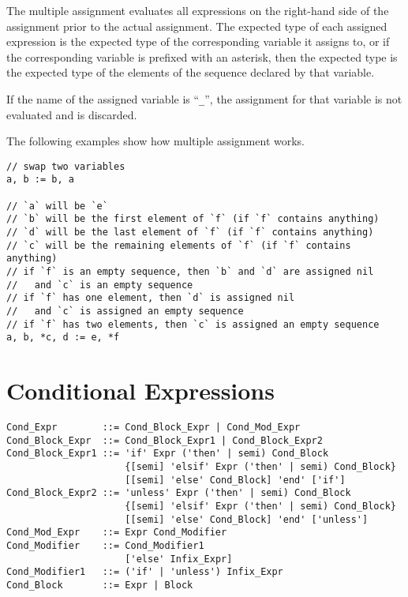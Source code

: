 The multiple assignment evaluates all expressions on the right-hand side of the assignment prior to the actual assignment. The expected type of each assigned expression is the expected type of the corresponding variable it assigns to, or if the corresponding variable is prefixed with an asterisk, then the expected type is the expected type of the elements of the sequence declared by that variable. 

If the name of the assigned variable is ``\lstinline!_!'', the assignment for that variable is not evaluated and is discarded. 

\example The following examples show how multiple assignment works. 
\begin{lstlisting}
// swap two variables
a, b := b, a

// `a` will be `e`
// `b` will be the first element of `f` (if `f` contains anything)
// `d` will be the last element of `f` (if `f` contains anything)
// `c` will be the remaining elements of `f` (if `f` contains anything)
// if `f` is an empty sequence, then `b` and `d` are assigned nil
//   and `c` is an empty sequence
// if `f` has one element, then `d` is assigned nil 
//   and `c` is assigned an empty sequence
// if `f` has two elements, then `c` is assigned an empty sequence
a, b, *c, d := e, *f
\end{lstlisting}





\section{Conditional Expressions}
\label{sec:conditional-expressions}

\syntax\begin{lstlisting}
Cond_Expr        ::= Cond_Block_Expr | Cond_Mod_Expr
Cond_Block_Expr  ::= Cond_Block_Expr1 | Cond_Block_Expr2
Cond_Block_Expr1 ::= 'if' Expr ('then' | semi) Cond_Block 
                     {[semi] 'elsif' Expr ('then' | semi) Cond_Block}
                     [[semi] 'else' Cond_Block] 'end' ['if']
Cond_Block_Expr2 ::= 'unless' Expr ('then' | semi) Cond_Block 
                     {[semi] 'elsif' Expr ('then' | semi) Cond_Block}
                     [[semi] 'else' Cond_Block] 'end' ['unless']
Cond_Mod_Expr    ::= Expr Cond_Modifier
Cond_Modifier    ::= Cond_Modifier1
                     ['else' Infix_Expr]
Cond_Modifier1   ::= ('if' | 'unless') Infix_Expr 
Cond_Block       ::= Expr | Block
\end{lstlisting}

